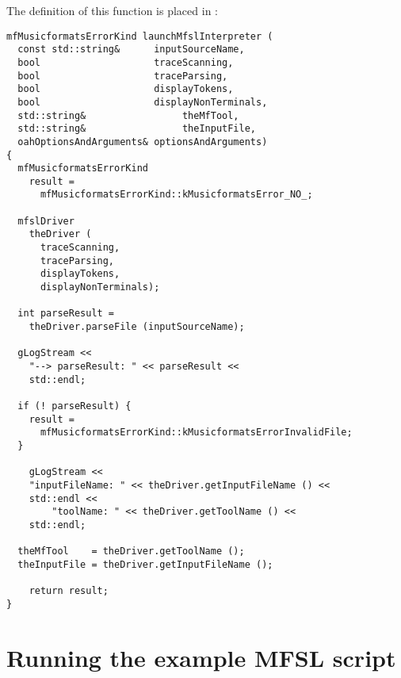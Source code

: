 The definition of this function is placed in :
\begin{lstlisting}[language=Terminal]
mfMusicformatsErrorKind launchMfslInterpreter (
  const std::string&      inputSourceName,
  bool                    traceScanning,
  bool                    traceParsing,
  bool                    displayTokens,
  bool                    displayNonTerminals,
  std::string&                 theMfTool,
  std::string&                 theInputFile,
  oahOptionsAndArguments& optionsAndArguments)
{
  mfMusicformatsErrorKind
    result =
      mfMusicformatsErrorKind::kMusicformatsError_NO_;

  mfslDriver
    theDriver (
      traceScanning,
      traceParsing,
      displayTokens,
      displayNonTerminals);

  int parseResult =
  	theDriver.parseFile (inputSourceName);

  gLogStream <<
    "--> parseResult: " << parseResult <<
    std::endl;

  if (! parseResult) {
    result =
      mfMusicformatsErrorKind::kMusicformatsErrorInvalidFile;
  }

	gLogStream <<
    "inputFileName: " << theDriver.getInputFileName () <<
  	std::endl <<
		"toolName: " << theDriver.getToolName () <<
  	std::endl;

  theMfTool    = theDriver.getToolName ();
  theInputFile = theDriver.getInputFileName ();

	return result;
}
\end{lstlisting}


\section{Running the example MFSL script}

